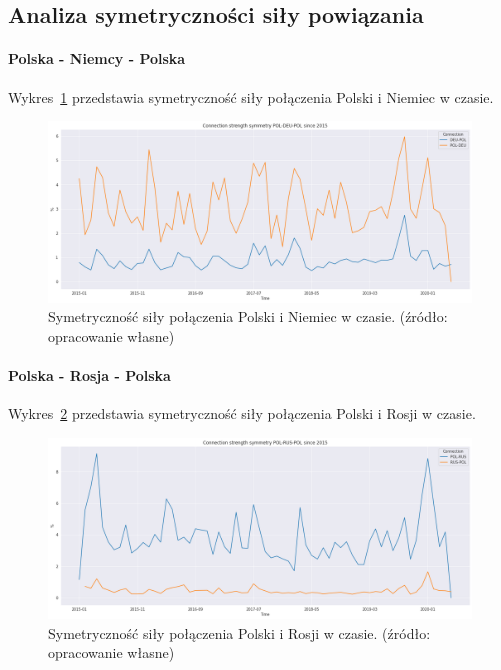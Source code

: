 \documentclass[11pt]{report}
\begin{document}
    \subsection{Analiza symetryczności siły powiązania}

    \paragraph{Polska - Niemcy - Polska}

    Wykres~\ref{fig:POL-DEU-POL} przedstawia symetryczność siły połączenia Polski i Niemiec w czasie.


    \begin{figure}[!htp]
        \centering
        \includegraphics[width=\linewidth]{fig/ConnectionSymmetry/POL-DEU-POL.png}
        \caption{Symetryczność siły połączenia Polski i Niemiec w czasie. (źródło: opracowanie własne)}
        \label{fig:POL-DEU-POL}
    \end{figure}

    \paragraph{Polska - Rosja - Polska}

    Wykres~\ref{fig:POL-RUS-POL} przedstawia symetryczność siły połączenia Polski i Rosji w czasie.


    \begin{figure}[!htp]
        \centering
        \includegraphics[width=\linewidth]{fig/ConnectionSymmetry/POL-RUS-POL.png}
        \caption{Symetryczność siły połączenia Polski i Rosji w czasie. (źródło: opracowanie własne)}
        \label{fig:POL-RUS-POL}
    \end{figure}
\end{document}
